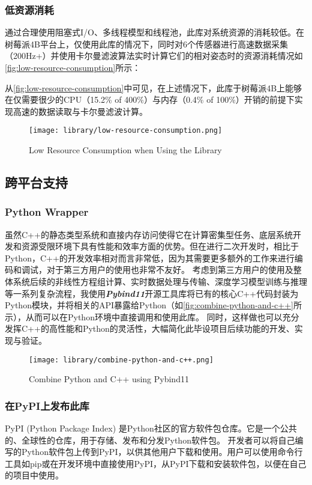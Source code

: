 \subsubsection{低资源消耗}
通过合理使用阻塞式I/O、多线程模型和线程池，此库对系统资源的消耗较低。在树莓派4B平台上，仅使用此库的情况下，同时对6个传感器进行高速数据采集（200Hz+）并使用卡尔曼滤波算法实时计算它们的相对姿态时的资源消耗情况如\autoref{fig:low-resource-consumption}所示：

从\autoref{fig:low-resource-consumption}中可见，在上述情况下，此库于树莓派4B上能够在仅需要很少的CPU（15.2\% of 400\%）与内存（0.4\% of 100\%）开销的前提下实现高速的数据读取与卡尔曼滤波计算。

\begin{figure}[H]
    \centering
    \texttt{[image: library/low-resource-consumption.png]}
    \caption{\label{fig:low-resource-consumption}Low Resource Consumption when Using the Library}
\end{figure}

\subsection{跨平台支持}
\subsubsection{Python Wrapper}
虽然C++的静态类型系统和直接内存访问使得它在计算密集型任务、底层系统开发和资源受限环境下具有性能和效率方面的优势。但在进行二次开发时，相比于Python，C++的开发效率相对而言非常低，因为其需要更多额外的工作来进行编码和调试，对于第三方用户的使用也非常不友好。
考虑到第三方用户的使用及整体系统后续的非线性方程组计算、实时数据处理与传输、深度学习模型训练与推理等一系列复杂流程，我使用{\bfseries \itshape Pybind11}开源工具库将已有的核心C++代码封装为Python模块，并将相关的API暴露给Python（如\autoref{fig:combine-python-and-c++}所示），从而可以在Python环境中直接调用和使用此库。
同时，这样做也可以充分发挥C++的高性能和Python的灵活性，大幅简化此毕设项目后续功能的开发、实现与验证。

\begin{figure}[H]
    \centering
    \texttt{[image: library/combine-python-and-c++.png]}
    \caption{\label{fig:combine-python-and-c++}Combine Python and C++ using Pybind11}
\end{figure}

\subsubsection{在PyPI上发布此库}
PyPI (Python Package Index) 是Python社区的官方软件包仓库。它是一个公共的、全球性的仓库，用于存储、发布和分发Python软件包。
开发者可以将自己编写的Python软件包上传到PyPI，以供其他用户下载和使用。用户可以使用命令行工具如pip或在开发环境中直接使用PyPI，从PyPI下载和安装软件包，以便在自己的项目中使用。

